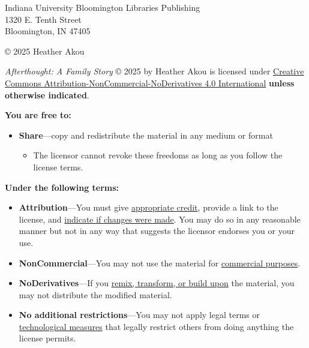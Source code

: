 \begin{flushleft}
\thispagestyle{empty}
\begin{small}
Indiana University Bloomington Libraries Publishing\\
1320 E. Tenth Street\\
Bloomington, IN 47405
\vspace{5mm}

© 2025 Heather Akou

\vspace{4mm}
\ccbyncnd

\textit{Afterthought: A Family Story} © 2025 by Heather Akou is licensed under \href{https://creativecommons.org/licenses/by-nc-nd/4.0/?ref=chooser-v1}{Creative Commons Attribution-NonCommercial-NoDerivatives 4.0 International} \textbf{unless otherwise indicated}.  

\vspace{3mm}

\textbf{You are free to:}
\begin{itemize}
\tightlist
\item \textbf{Share}---copy and redistribute the material in any medium or format
  \begin{itemize}
    \item The licensor cannot revoke these freedoms as long as you follow the license terms.
  \end{itemize}
\end{itemize}

\vspace{3mm}

\textbf{Under the following terms:}
\begin{itemize}
\tightlist
\item \textbf{Attribution}---You must give \href{https://creativecommons.org/licenses/by-nc-nd/4.0/?ref=chooser-v1#ref-appropriate-credit}{appropriate credit}, provide a link to the license, and \href{https://creativecommons.org/licenses/by-nc-nd/4.0/?ref=chooser-v1#ref-indicate-changes}{indicate if changes were made}. You may do so in any reasonable manner but not in any way that suggests the licensor endorses you or your use.\\
\item \textbf{NonCommercial}---You may not use the material for \href{https://creativecommons.org/licenses/by-nc-nd/4.0/?ref=chooser-v1#ref-commercial-purposes}{commercial purposes}.
\item \textbf{NoDerivatives}---If you \href{https://creativecommons.org/licenses/by-nc-nd/4.0/?ref=chooser-v1#ref-some-kinds-of-mods}{remix, transform, or build upon} the material, you may not distribute the modified material.
\item \textbf{No additional restrictions}---You may not apply legal terms or \href{https://creativecommons.org/licenses/by-nc-nd/4.0/?ref=chooser-v1#ref-technological-measures}{technological measures} that legally restrict others from doing anything the license permits.
\end{itemize}


\end{small}
\end{flushleft}
